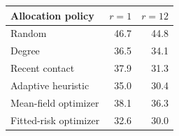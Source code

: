 \begin{tabular}{lrr}\toprule
Allocation policy & $r=1$ & $r=12$\\\midrule
Random & 46.7 & 44.8\\
Degree & 36.5 & 34.1\\
Recent contact & 37.9 & 31.3\\
Adaptive heuristic & 35.0 & 30.4\\
Mean-field optimizer & 38.1 & 36.3\\
Fitted-risk optimizer & 32.6 & 30.0\\
\bottomrule\end{tabular}
